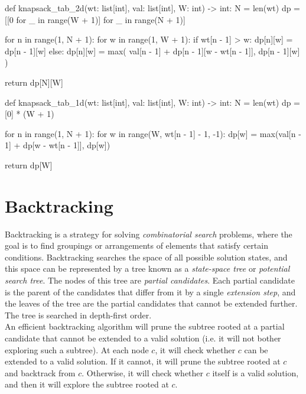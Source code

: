 \documentclass[12pt, titlepage]{article}
\begin{document}
\begin{python}
def knapsack_tab_2d(wt: list[int], val: list[int], W: int) -> int:
    N = len(wt)
    dp = [[0 for _ in range(W + 1)] for _ in range(N + 1)]

    for n in range(1, N + 1):
        for w in range(1, W + 1):
            if wt[n - 1] > w:
                dp[n][w] = dp[n - 1][w]
            else:
                dp[n][w] = max(
                    val[n - 1] + dp[n - 1][w - wt[n - 1]],
                    dp[n - 1][w]
                )

    return dp[N][W]
\end{python}

\begin{python}
def knapsack_tab_1d(wt: list[int], val: list[int], W: int) -> int:
    N = len(wt)
    dp = [0] * (W + 1)

    for n in range(1, N + 1):
        for w in range(W, wt[n - 1] - 1, -1):
            dp[w] = max(val[n - 1] + dp[w - wt[n - 1]], dp[w])

    return dp[W]
\end{python}

\section{Backtracking}

Backtracking is a strategy for solving \textit{combinatorial search} problems, where the goal is to find groupings or arrangements of elements that satisfy certain conditions. Backtracking searches the space of all possible solution states, and this space can be represented by a tree known as a \textit{state-space tree} or \textit{potential search tree}. The nodes of this tree are \textit{partial candidates}. Each partial candidate is the parent of the candidates that differ from it by a single \textit{extension step}, and the leaves of the tree are the partial candidates that cannot be extended further. The tree is searched in depth-first order. \\

An efficient backtracking algorithm will prune the subtree rooted at a partial candidate that cannot be extended to a valid solution (i.e. it will not bother exploring such a subtree). At each node $c$, it will check whether $c$ can be extended to a valid solution. If it cannot, it will prune the subtree rooted at $c$ and backtrack from $c$. Otherwise, it will check whether $c$ itself is a valid solution, and then it will explore the subtree rooted at $c$. \\
\end{document}
